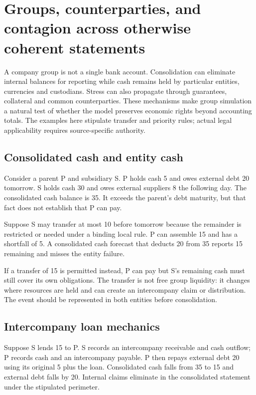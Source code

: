 \chapter[Groups, counterparties, and contagion]{Groups, counterparties, and contagion across otherwise coherent statements}
\label{sim:groups}

A company group is not a single bank account. Consolidation can eliminate internal balances for reporting while cash remains held by particular entities, currencies and custodians. Stress can also propagate through guarantees, collateral and common counterparties. These mechanisms make group simulation a natural test of whether the model preserves economic rights beyond accounting totals. The examples here stipulate transfer and priority rules; actual legal applicability requires source-specific authority.

\section{Consolidated cash and entity cash}
Consider a parent P and subsidiary S. P holds cash 5 and owes external debt 20 tomorrow. S holds cash 30 and owes external suppliers 8 the following day. The consolidated cash balance is 35. It exceeds the parent's debt maturity, but that fact does not establish that P can pay.

Suppose S may transfer at most 10 before tomorrow because the remainder is restricted or needed under a binding local rule. P can assemble 15 and has a shortfall of 5. A consolidated cash forecast that deducts 20 from 35 reports 15 remaining and misses the entity failure.

If a transfer of 15 is permitted instead, P can pay but S's remaining cash must still cover its own obligations. The transfer is not free group liquidity: it changes where resources are held and can create an intercompany claim or distribution. The event should be represented in both entities before consolidation.

\section{Intercompany loan mechanics}
Suppose S lends 15 to P. S records an intercompany receivable and cash outflow; P records cash and an intercompany payable. P then repays external debt 20 using its original 5 plus the loan. Consolidated cash falls from 35 to 15 and external debt falls by 20. Internal claims eliminate in the consolidated statement under the stipulated perimeter.

